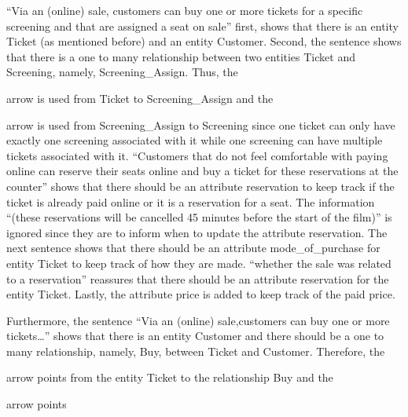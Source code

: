 \documentclass{article}
\begin{document}
``Via an (online) sale, customers can buy one or more tickets for a specific
screening and that are assigned a seat on sale'' first, shows that there is an
entity Ticket (as mentioned before) and an entity Customer. Second, the sentence
shows that there is a one to many relationship between two entities Ticket and
Screening, namely, Screening\_Assign. Thus, the
arrow is used from Ticket to Screening\_Assign and the
arrow is used from Screening\_Assign to Screening since one ticket can only have
exactly one screening associated with it while one screening can have multiple
tickets associated with it. ``Customers that do not feel comfortable with paying
online can reserve their seats online and buy a ticket for these reservations
at the counter'' shows that there should be an attribute reservation to keep
track if the ticket is already paid online or it is a reservation for a seat.
The information ``(these reservations will be cancelled 45 minutes before the
start of the film)'' is ignored since they are to inform when to update the
attribute reservation. The next sentence shows that there should be an attribute
mode\_of\_purchase for entity Ticket to keep track of how they are made. ``whether
the sale was related to a reservation'' reassures that there should be an 
attribute reservation for the entity Ticket. Lastly, the attribute price is added
to keep track of the paid price.

Furthermore, the sentence ``Via an (online) sale,customers can buy one or more
tickets\dots'' shows that there is an entity Customer and there should be a one
to many relationship, namely, Buy, between Ticket and Customer. Therefore, the
arrow points from the entity Ticket to the relationship Buy and the
arrow points 
\end{document}
